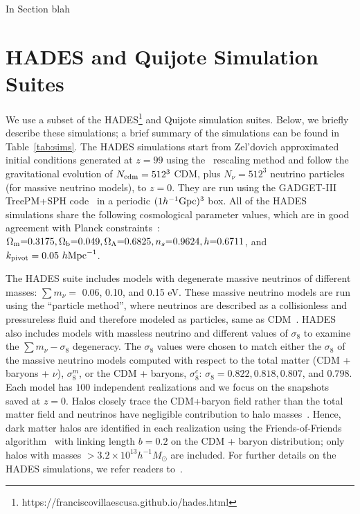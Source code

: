 \documentclass[12pt, letterpaper, preprint]{aastex62}
\newcommand{\Om}{\Omega_{\rm m}}
\newcommand{\Ob}{\Omega_{\rm b}}
\newcommand{\OL}{\Omega_\Lambda}
\newcommand{\smnu}{\sum m_\nu}
\begin{document}
In Section blah 


\section{HADES and Quijote Simulation Suites} \label{sec:hades} 
We use a subset of the HADES\footnote{https://franciscovillaescusa.github.io/hades.html} 
and Quijote simulation suites. Below, we briefly describe these simulations; 
a brief summary of the simulations can be found in Table~\ref{tab:sims}. 
The HADES simulations start from Zel'dovich approximated initial conditions 
generated at $z=99$ using the~\cite{zennaro2017a} rescaling method and follow 
the gravitational evolution of $N_{\rm cdm}=512^3$ CDM, plus $N_{\nu}=512^3$ 
neutrino particles (for massive neutrino models), to $z=0$. They are run using 
the {\sc GADGET-III} TreePM+SPH code~\citep{springel2005} in a periodic 
$(1 h^{-1}{\rm Gpc})^3$ box. All of the HADES simulations share the following 
cosmological parameter values, which are in good agreement with Planck 
constraints~\cite{ade2016a}: $\Om{=}0.3175, \Ob{=}0.049, \OL{=}0.6825, n_s{=}0.9624, h{=}0.6711$, 
and $k_{\rm pivot} = 0.05~h{\rm Mpc}^{-1}$. 

The HADES suite includes models with degenerate massive neutrinos of different 
masses: $\smnu = $ 0.06, 0.10, and 0.15 eV. These massive neutrino models are run 
using the ``particle method'', where neutrinos are described as a collisionless 
and pressureless fluid and therefore modeled as particles, same as 
CDM~\citep{brandbyge2008,viel2010}. HADES also includes models with massless 
neutrino and different values of $\sigma_8$ to examine the $\smnu-\sigma_8$ 
degeneracy. The $\sigma_8$ values were chosen to match either the $\sigma_8$ 
of the massive neutrino models computed with respect to the total matter 
(CDM + baryons + $\nu$), $\sigma_8^m$, or the CDM + baryons, $\sigma_8^{c}$: 
$\sigma_8 = 0.822, 0.818, 0.807$, and $0.798$. Each model has $100$ independent 
realizations and we focus on the snapshots saved at $z = 0$. Halos closely 
trace the CDM+baryon field rather than the total matter field and neutrinos 
have negligible contribution to halo masses~\citep[\emph{e.g.}][]{ichiki2012, castorina2014, loverde2014, villaescusa-navarro2014}.
Hence, dark matter halos are identified in each realization using the Friends-of-Friends 
algorithm~\cite[FoF][]{davis1985} with linking length $b=0.2$ on the CDM + baryon
distribution; only halos with masses $> 3.2\times 10^{13} h^{-1}M_\odot$ 
are included. For further details on the HADES simulations, we refer readers 
to~\cite{villaescusa-navarro2018}. 
\end{document}
